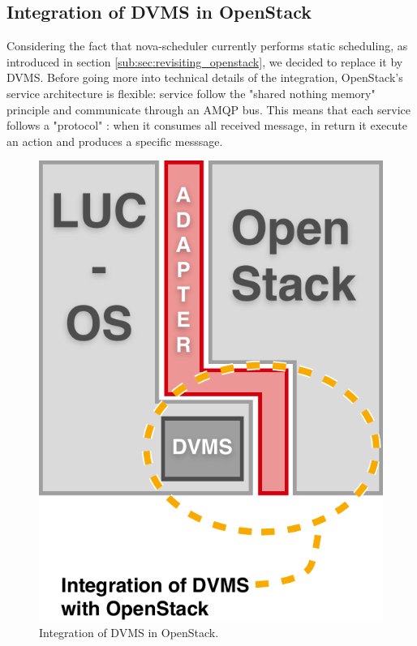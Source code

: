 \subsection{Integration of DVMS in OpenStack}

\label{sub:sec:integration_dvms}








Considering the fact that nova-scheduler currently performs static scheduling, 
as introduced in section \ref{sub:sec:revisiting_openstack}, we decided to 
replace it by DVMS. Before going more into technical details of the integration,
OpenStack's service architecture is flexible: service follow the "shared nothing
memory" principle and communicate through an AMQP bus. This means that each 
service follows a "protocol" : when it consumes all received message, in return
it execute an action and produces a specific messsage. 

\begin{figure}[h]
	\centering
	\includegraphics[width=0.50\linewidth]{Figures/dvms_openstack.pdf}
	\caption{Integration of DVMS in OpenStack.}%
	\label{fig:integration}%
\end{figure}


